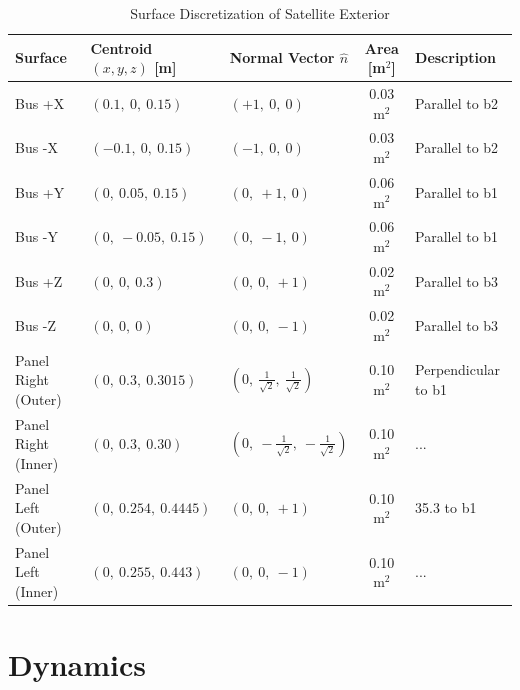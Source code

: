 \documentclass[12pt]{article}
\begin{document}
\begin{table}[H]
\centering
\caption{Surface Discretization of Satellite Exterior}
\vspace{6 pt}
\label{tab:surface_discretization}
\begin{tabularx}{\linewidth}{|l|X|X|c|X|}
\hline
\textbf{Surface} &
\textbf{Centroid $(x,y,z)$ [m]} &
\textbf{Normal Vector $\hat{n}$} &
\textbf{Area [m$^2$]} &
\textbf{Description} \\
\hline

Bus +X &
$(0.1,\ 0,\ 0.15)$ &
$(+1,\ 0,\ 0)$ &
0.03 m$^2$ &
Parallel to b2  \\
\hline

Bus -X &
$(-0.1,\ 0,\ 0.15)$ &
$(-1,\ 0,\ 0)$ &
0.03 m$^2$ &
Parallel to b2 \\
\hline

Bus +Y &
$(0,\ 0.05,\ 0.15)$ &
$(0,\ +1,\ 0)$ &
0.06 m$^2$ &
Parallel to b1 \\
\hline

Bus -Y &
$(0,\ -0.05,\ 0.15)$ &
$(0,\ -1,\ 0)$ &
0.06 m$^2$ &
Parallel to b1 \\
\hline

Bus +Z &
$(0,\ 0,\ 0.3)$ &
$(0,\ 0,\ +1)$ &
0.02 m$^2$ &
Parallel to b3 \\
\hline

Bus -Z &
$(0,\ 0,\ 0)$ &
$(0,\ 0,\ -1)$ &
0.02 m$^2$ &
Parallel to b3 \\
\hline

Panel Right (Outer) &
$(0,\ 0.3,\ 0.3015)$ &
$(0,\ \tfrac{1}{\sqrt{2}},\ \tfrac{1}{\sqrt{2}})$ &
0.10 m$^2$ &
Perpendicular to b1 \\
\hline

Panel Right (Inner) &
$(0,\ 0.3,\ 0.30)$ &
$(0,\ -\tfrac{1}{\sqrt{2}},\ -\tfrac{1}{\sqrt{2}})$ &
0.10 m$^2$ &
... \\
\hline

Panel Left (Outer) &
$(0,\ 0.254,\ 0.4445)$ &
$(0,\ 0,\ +1)$ &
0.10 m$^2$ &
35.3 to b1 \\
\hline

Panel Left (Inner) &
$(0,\ 0.255,\ 0.443)$ &
$(0,\ 0,\ -1)$ &
0.10 m$^2$ &
... \\
\hline

\end{tabularx}
\end{table}


\section{Dynamics}
\end{document}
